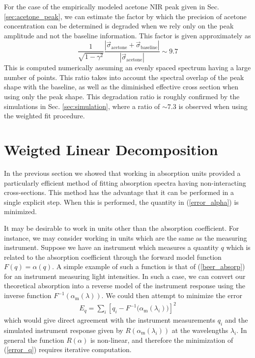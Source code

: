 \documentclass[12pt]{report}
\begin{document}
	For the case of the empirically modeled acetone NIR peak given in Sec. \ref{sec:acetone_peak}, we can estimate the factor by which the precision of acetone concentration can be determined is degraded when we rely only on the peak amplitude and not the baseline information. This factor is given approximately as
	\begin{equation}
		\frac{1}{\sqrt{1-\gamma^2}} \frac{\left|\vec{\sigma}_\mathrm{acetone} + \vec{\sigma}_\mathrm{baseline}\right|}{\left|\vec{\sigma}_\mathrm{acetone}\right|} \sim 9.7
	\end{equation}
	This is computed numerically assuming an evenly spaced spectrum having a large number of points. This ratio takes into account the spectral overlap of the peak shape with the baseline, as well as the diminished effective cross section when using only the peak shape. This degradation ratio is roughly confirmed by the simulations in Sec. \ref{sec:simulation}, where a ratio of $\sim7.3$ is observed when using the weighted fit procedure.
	
	\section{Weigted Linear Decomposition} \label{sec:weighted_fit}
	
	In the previous section we showed that working in absorption units provided a particularly efficient method of fitting absorption spectra having non-interacting cross-sections. This method has the advantage that it can be performed in a single explicit step. When this is performed, the quantity in (\ref{error_alpha}) is minimized.
	
	It may be desirable to work in units other than the absorption coefficient. For instance, we may consider working in units which are the same as the measuring instrument. Suppose we have an instrument which measures a quantity $q$ which is related to the absorption coefficient through the forward model function $F(q) = \alpha(q)$. A simple example of such a function is that of (\ref{beer_absorp}) for an instrument measuring light intensities. In such a case, we can convert our theoretical absorption into a reverse model of the instrument response using the inverse function $F^{-1}(\alpha_\mathrm{m}(\lambda))$. We could then attempt to minimize the error
	\begin{align}\label{error_q}
		E_q = \sum_i \left[ q_i - F^{-1}\big(\alpha_\mathrm{m}(\lambda_i)\big) \right]^2
	\end{align}
	which would give direct agreement with the instrument measurements $q_i$ and the simulated instrument response given by $R(\alpha_\mathrm{m}\left(\lambda_i\right))$ at the wavelengths $\lambda_i$. In general the function $R(\alpha)$ is non-linear, and therefore the minimization of (\ref{error_q}) requires iterative computation.
	
\end{document}
